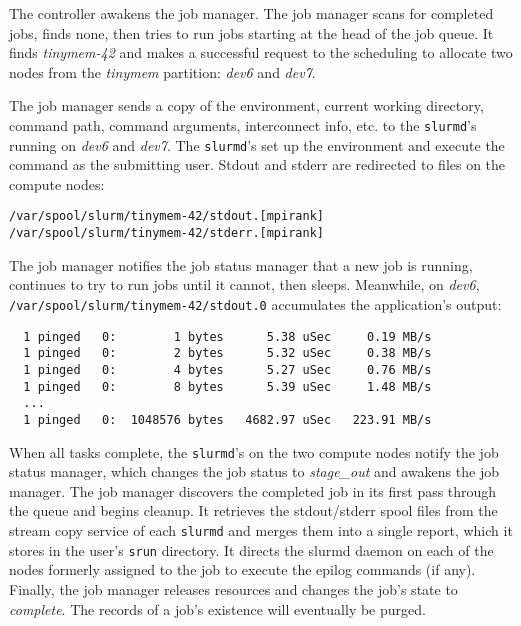 The controller awakens the job manager.
The job manager scans for completed jobs, finds none, then tries to run
jobs starting at the head of the job queue.  It finds {\em tinymem-42}
and makes a successful request to the scheduling to allocate 
two nodes from the {\em tinymem} partition: {\em dev6} and {\em dev7}.

The job manager sends a copy of the environment, current working directory,
command path, command arguments, interconnect info, etc.
to the {\tt slurmd}'s running on {\em dev6} and {\em dev7}.  
The {\tt slurmd}'s set up the environment and execute the command as 
the submitting user.  Stdout and stderr are redirected to files on the 
compute nodes:

\begin{verbatim}
/var/spool/slurm/tinymem-42/stdout.[mpirank]
/var/spool/slurm/tinymem-42/stderr.[mpirank]
\end{verbatim}

The job manager notifies the job status manager that a new job is running,
continues to try to run jobs until it cannot, then sleeps.
Meanwhile, on {\em dev6}, {\tt /var/spool/slurm/tinymem-42/stdout.0}
accumulates the application's output:

\begin{verbatim}
  1 pinged   0:        1 bytes      5.38 uSec     0.19 MB/s                     
  1 pinged   0:        2 bytes      5.32 uSec     0.38 MB/s                     
  1 pinged   0:        4 bytes      5.27 uSec     0.76 MB/s                     
  1 pinged   0:        8 bytes      5.39 uSec     1.48 MB/s                     
  ...
  1 pinged   0:  1048576 bytes   4682.97 uSec   223.91 MB/s              
\end{verbatim}

When all tasks complete, the {\tt slurmd}'s on the two compute nodes notify
the job status manager, which changes the job status to {\em stage_out} and 
awakens the job manager.  The job manager discovers the completed job in
its first pass through the queue and begins cleanup.
It retrieves the stdout/stderr spool files from the stream copy service
of each {\tt slurmd} and merges them into a single report, 
which it stores in the user's {\tt srun} directory.
It directs the slurmd daemon on each of the nodes formerly assigned to the 
job to execute the epilog commands (if any).
Finally, the job manager releases resources and changes the job's state to 
{\em complete}. The records of a job's existence will eventually be purged.


